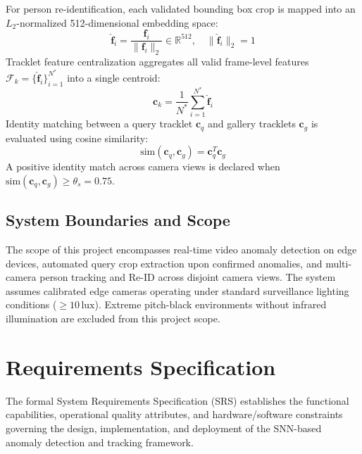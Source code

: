 \documentclass[12pt,a4paper]{report}
\begin{document}
For person re-identification, each validated bounding box crop is mapped into an $L_2$-normalized 512-dimensional embedding space:
\begin{equation}
    \hat{\mathbf{f}}_i = \frac{\mathbf{f}_i}{\|\mathbf{f}_i\|_2} \in \mathbb{R}^{512}, \quad \|\hat{\mathbf{f}}_i\|_2 = 1
\end{equation}
Tracklet feature centralization aggregates all valid frame-level features $\mathcal{F}_k = \{\hat{\mathbf{f}}_i\}_{i=1}^{N^*}$ into a single centroid:
\begin{equation}
    \mathbf{c}_k = \frac{1}{N^*} \sum_{i=1}^{N^*} \hat{\mathbf{f}}_i
\end{equation}
Identity matching between a query tracklet $\mathbf{c}_q$ and gallery tracklets $\mathbf{c}_g$ is evaluated using cosine similarity:
\begin{equation}
    \text{sim}(\mathbf{c}_q, \mathbf{c}_g) = \mathbf{c}_q^T \mathbf{c}_g
\end{equation}
A positive identity match across camera views is declared when $\text{sim}(\mathbf{c}_q, \mathbf{c}_g) \ge \theta_s = 0.75$.

\section{System Boundaries and Scope}
The scope of this project encompasses real-time video anomaly detection on edge devices, automated query crop extraction upon confirmed anomalies, and multi-camera person tracking and Re-ID across disjoint camera views. The system assumes calibrated edge cameras operating under standard surveillance lighting conditions ($\ge 10\,\text{lux}$). Extreme pitch-black environments without infrared illumination are excluded from this project scope.


\chapter{Requirements Specification}

The formal System Requirements Specification (SRS) establishes the functional capabilities, operational quality attributes, and hardware/software constraints governing the design, implementation, and deployment of the SNN-based anomaly detection and tracking framework.
\end{document}
